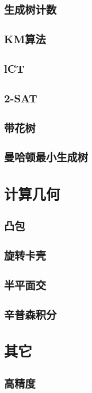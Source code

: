 \documentclass[UTF8,a4paper]{ctexart}
\begin{document}
\subsection{生成树计数}

\subsection{KM算法}

\subsection{lCT}

\subsection{2-SAT}

\subsection{带花树}

\subsection{曼哈顿最小生成树}

\section{计算几何}

\subsection{凸包}

\subsection{旋转卡壳}

\subsection{半平面交}

\subsection{辛普森积分}

\section{其它}

\subsection{高精度}

\maketitle 
\end{document}
